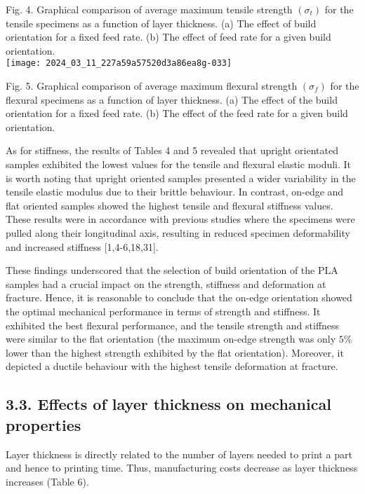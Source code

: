 \documentclass[10pt]{article}
\begin{document}
Fig. 4. Graphical comparison of average maximum tensile strength $\left(\sigma_{t}\right)$ for the tensile specimens as a function of layer thickness. (a) The effect of build orientation for a fixed feed rate. (b) The effect of feed rate for a given build orientation.\\
\texttt{[image: 2024\_03\_11\_227a59a57520d3a86ea8g-033]}

Fig. 5. Graphical comparison of average maximum flexural strength $\left(\sigma_{f}\right)$ for the flexural specimens as a function of layer thickness. (a) The effect of the build orientation for a fixed feed rate. (b) The effect of the feed rate for a given build orientation.

As for stiffness, the results of Tables 4 and 5 revealed that upright orientated samples exhibited the lowest values for the tensile and flexural elastic moduli. It is worth noting that upright oriented samples presented a wider variability in the tensile elastic modulus due to their brittle behaviour. In contrast, on-edge and flat oriented samples showed the highest tensile and flexural stiffness values. These results were in accordance with previous studies where the specimens were pulled along their longitudinal axis, resulting in reduced specimen deformability and increased stiffness [1,4-6,18,31].

These findings underscored that the selection of build orientation of the PLA samples had a crucial impact on the strength, stiffness and deformation at fracture. Hence, it is reasonable to conclude that the on-edge orientation showed the optimal mechanical performance in terms of strength and stiffness. It exhibited the best flexural performance, and the tensile strength and stiffness were similar to the flat orientation (the maximum on-edge strength was only $5 \%$ lower than the highest strength exhibited by the flat orientation). Moreover, it depicted a ductile behaviour with the highest tensile deformation at fracture.

\subsection*{3.3. Effects of layer thickness on mechanical properties}
Layer thickness is directly related to the number of layers needed to print a part and hence to printing time. Thus, manufacturing costs decrease as layer thickness increases (Table 6).
\end{document}
